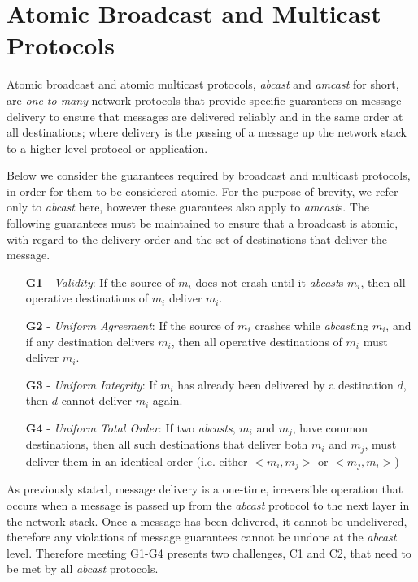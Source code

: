 \section{Atomic Broadcast and Multicast Protocols} \label{sec:atomic_guarantees}
Atomic broadcast and atomic multicast protocols, \emph{abcast} and \emph{amcast} for short, are \emph{one-to-many} network protocols that provide specific guarantees on message delivery to ensure that messages are delivered reliably and in the same order at all destinations; where delivery is the passing of a message up the network stack to a higher level protocol or application.  

Below we consider the guarantees required by broadcast and multicast protocols, in order for them to be considered atomic.  For the purpose of brevity, we refer only to \emph{abcast} here, however these guarantees also apply to \emph{amcast}s.  The following guarantees must be maintained to ensure that a broadcast is atomic, with regard to the delivery order and the set of destinations that deliver the message.  

\begin{itemize}
    \item [\textbf{G1}] - \emph{Validity}: If the source of $m_i$ does not crash until it \emph{abcast}s $m_i$, then all operative destinations of $m_i$ deliver $m_i$.
    \item [\textbf{G2}] - \emph{Uniform Agreement}: If the source of $m_i$ crashes while \emph{abcast}ing $m_i$, and if any destination delivers $m_i$, then all operative
destinations of $m_i$ must deliver $m_i$.
    \item [\textbf{G3}] - \emph{Uniform Integrity}: If $m_i$ has already been delivered by a destination $d$, then $d$ cannot deliver $m_i$ again.  
    \item [\textbf{G4}] - \emph{Uniform Total Order}: If two \emph{\emph{abcast}s}, $m_i$ and $m_j$, have
common destinations, then all such destinations that deliver both $m_i$ and $m_j$, must deliver them in an identical order (i.e. either $<m_i, m_j>$ or $<m_j, m_i>$)
\end{itemize}

As previously stated, message delivery is a one-time, irreversible operation that occurs when a message is passed up from the \emph{abcast} protocol to the next layer in the network stack. Once a message has been delivered, it cannot be undelivered, therefore any violations of message guarantees cannot be undone at the \emph{abcast} level.  Therefore meeting G1-G4 presents two challenges, C1 and C2, that need to be met by all \emph{abcast} protocols.

